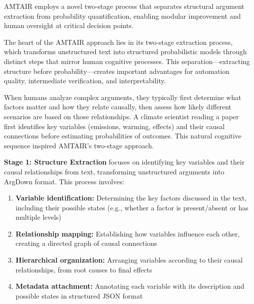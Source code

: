 \documentclass[
  11pt,
  letterpaper,
]{book}
\begin{document}
\begin{tcolorbox}[enhanced jigsaw, opacitybacktitle=0.6, colbacktitle=quarto-callout-tip-color!10!white, toptitle=1mm, colback=white, breakable, left=2mm, bottomrule=.15mm, title=\textcolor{quarto-callout-tip-color}{\faLightbulb}\hspace{0.5em}{The Two-Stage Extraction Process}, rightrule=.15mm, arc=.35mm, toprule=.15mm, opacityback=0, colframe=quarto-callout-tip-color-frame, bottomtitle=1mm, titlerule=0mm, leftrule=.75mm, coltitle=black]

AMTAIR employs a novel two-stage process that separates structural
argument extraction from probability quantification, enabling modular
improvement and human oversight at critical decision points.

\end{tcolorbox}

The heart of the AMTAIR approach lies in its two-stage extraction
process, which transforms unstructured text into structured
probabilistic models through distinct steps that mirror human cognitive
processes. This separation---extracting structure before
probability---creates important advantages for automation quality,
intermediate verification, and interpretability.

When humans analyze complex arguments, they typically first determine
what factors matter and how they relate causally, then assess how likely
different scenarios are based on those relationships. A climate
scientist reading a paper first identifies key variables (emissions,
warming, effects) and their causal connections before estimating
probabilities of outcomes. This natural cognitive sequence inspired
AMTAIR's two-stage approach.

\textbf{Stage 1: Structure Extraction} focuses on identifying key
variables and their causal relationships from text, transforming
unstructured arguments into ArgDown format. This process involves:

\begin{enumerate}
\def\labelenumi{\arabic{enumi}.}
\item
  \textbf{Variable identification:} Determining the key factors
  discussed in the text, including their possible states (e.g., whether
  a factor is present/absent or has multiple levels)
\item
  \textbf{Relationship mapping:} Establishing how variables influence
  each other, creating a directed graph of causal connections
\item
  \textbf{Hierarchical organization:} Arranging variables according to
  their causal relationships, from root causes to final effects
\item
  \textbf{Metadata attachment:} Annotating each variable with its
  description and possible states in structured JSON format
\end{enumerate}
\end{document}
